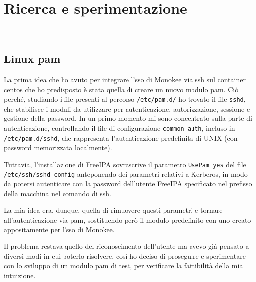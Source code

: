 
\chapter{Ricerca e sperimentazione}
\label{cap:ricerca-sperimentazione}

\\

\section{Linux \acrshort{pam}}
\label{sec:tecnologie-strumenti}

La prima idea che ho avuto per integrare l'\acrshort{sso} di Monokee via \acrshort{ssh} sul container \acrshort{centos} che ho predisposto è stata quella di creare un nuovo modulo \acrshort{pam}. Ciò perché, studiando i file presenti al percorso \texttt{/etc/pam.d/} ho trovato il file \texttt{sshd}, che stabilisce i moduli da utilizzare per autenticazione, autorizzazione, sessione e gestione della password. In un primo momento mi sono concentrato sulla parte di autenticazione, controllando il file di configurazione \texttt{common-auth}, incluso in \texttt{/etc/pam.d/sshd}, che rappresenta l'autenticazione predefinita di UNIX (con password memorizzata localmente). 

Tuttavia, l'installazione di FreeIPA sovrascrive il parametro \texttt{UsePam yes} del file \texttt{/etc/ssh/sshd\_config} anteponendo dei parametri relativi a Kerberos, in modo da potersi autenticare con la password dell'utente FreeIPA specificato nel prefisso della macchina nel comando di \acrshort{ssh}.

La mia idea era, dunque, quella di rimuovere questi parametri e tornare all'autenticazione via \acrshort{pam}, sostituendo però il modulo predefinito con uno creato appositamente per l'\acrshort{sso} di Monokee.

Il problema restava quello del riconoscimento dell'utente ma avevo già pensato a diversi modi in cui poterlo risolvere, così ho deciso di proseguire e sperimentare con lo sviluppo di un modulo \acrshort{pam} di test, per verificare la fattibilità della mia intuizione.

